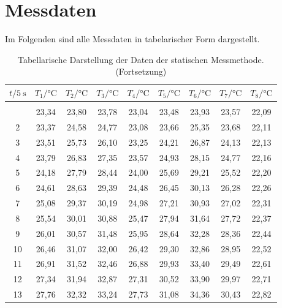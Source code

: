 \section{Messdaten}
\label{sec:Messdaten}
Im Folgenden sind alle Messdaten in tabelarischer Form dargestellt.
      \begin{longtable}{c c c c c c c c c}
        \caption{Tabellarische Darstellung der Daten der statischen Messmethode.}\label{tab:data statisch}\\
        \hline
        {$t / \qty{5}{\second}$} & {$T_{1} / \unit{\celsius}$} & {$T_{2} / \unit{\celsius}$} &%
        {$T_{3} / \unit{\celsius}$} & {$T_{4} / \unit{\celsius}$} &%
        {$T_{5} / \unit{\celsius}$} & {$T_{6} / \unit{\celsius}$} &%
        {$T_{7} / \unit{\celsius}$} & {$T_{8} / \unit{\celsius}$} \\
        \hline
        \endfirsthead
        \caption[]{Tabellarische Darstellung der Daten der statischen Messmethode. (Fortsetzung)}\\
        \hline
        \endhead
        \hline
        \endfoot
      1	  & 23,34	& 23,80	& 23,78	& 23,04	& 23,48	& 23,93	& 23,57	& 22,09 \\
      2	  & 23,37	& 24,58	& 24,77	& 23,08	& 23,66	& 25,35	& 23,68	& 22,11 \\
      3	  & 23,51	& 25,73	& 26,10	& 23,25	& 24,21	& 26,87	& 24,13	& 22,13 \\
      4	  & 23,79	& 26,83	& 27,35	& 23,57	& 24,93	& 28,15	& 24,77	& 22,16 \\
      5	  & 24,18	& 27,79	& 28,44	& 24,00	& 25,69	& 29,21	& 25,52	& 22,20 \\
      6	  & 24,61	& 28,63	& 29,39	& 24,48	& 26,45	& 30,13	& 26,28	& 22,26 \\
      7	  & 25,08	& 29,37	& 30,19	& 24,98	& 27,21	& 30,93	& 27,02	& 22,31 \\
      8	  & 25,54	& 30,01	& 30,88	& 25,47	& 27,94	& 31,64	& 27,72	& 22,37 \\
      9	  & 26,01	& 30,57	& 31,48	& 25,95	& 28,64	& 32,28	& 28,36	& 22,44 \\
      10	& 26,46	& 31,07	& 32,00	& 26,42	& 29,30	& 32,86	& 28,95	& 22,52 \\
      11	& 26,91	& 31,52	& 32,46	& 26,88	& 29,93	& 33,40	& 29,49	& 22,61 \\
      12	& 27,34	& 31,94	& 32,87	& 27,31	& 30,52	& 33,90	& 29,97	& 22,71 \\
      13	& 27,76	& 32,32	& 33,24	& 27,73	& 31,08	& 34,36	& 30,43	& 22,82 \\

\end{longtable}
